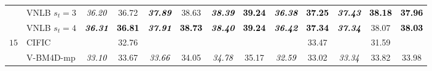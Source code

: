 \documentclass[10pt, journal, twocolumn, final, a4paper]{IEEEtran}
\newcommand{\best}[1]{#1}
\newcommand{\bsic}[1]{\textcolor{black}{\textit{#1}}}
\newcommand{\Bsic}[1]{\textcolor{black}{\textbf{\textit{#1}}}}
\newcommand{\Best}[1]{\textbf{\textcolor{black}{#1}}}
\begin{document}
\begin{table}[htp!]
\begin{center}
{\begin{tabular}{ c | l |c c | c c | c c | c c | c c | c}
			                      & VNLB   $s_t = 3$     & \bsic{36.20} &       36.72  & \Bsic{37.89} &       38.63  & \Bsic{38.39} & \Best{39.24} & \Bsic{36.38} & \Best{37.25} & \Bsic{37.43} & \Best{38.18} & \Best{37.96} \\
			                      & VNLB   $s_t = 4$     & \Bsic{36.31} & \Best{36.81} & \Bsic{37.91} & \Best{38.73} & \Bsic{38.40} & \Best{39.24} & \Bsic{36.42} & \Best{37.34} & \Bsic{37.34} &       38.07  & \Best{38.03} \\\hline
%
			\multirow{1}{*}{$15$}
			                      & CIFIC                & \bsic{     } &       32.76  & \bsic{     } &              & \bsic{     } &              & \bsic{     } &       33.47  & \bsic{     } &       31.59  &              \\
			                      & V-BM4D-mp            & \bsic{33.10} &       33.67  & \bsic{33.66} &       34.05  & \bsic{34.78} &       35.17  & \bsic{32.59} &       33.02  & \bsic{33.34} &       33.82  &       33.98  \\

\end{tabular}}
\end{center}
\end{table}
\end{document}
